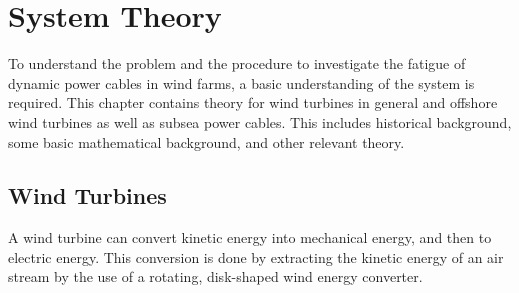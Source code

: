 \chapter{System Theory}
\label{chap:sysdes}
To understand the problem and the procedure to investigate the fatigue of dynamic power cables in wind farms, a basic understanding of the system is required. This chapter contains theory for wind turbines in general and offshore wind turbines as well as subsea power cables. This includes historical background, some basic mathematical background, and other relevant theory. 
\section{Wind Turbines}
A wind turbine can convert kinetic energy into mechanical energy, and then to electric energy. This conversion is done by extracting the kinetic energy of an air stream by the use of a rotating, disk-shaped wind energy converter. \cite{Hau2013}

